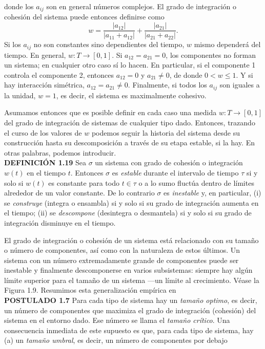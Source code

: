 {\fontsize{13}{15}\selectfont
donde los \( a_{ij} \) son en general números complejos. El grado de integración o cohesión del sistema puede entonces definirse como
\[w = \frac{|a_{12}|}{|a_{11} + a_{12}|} + \frac{|a_{21}|}{|a_{21} + a_{22}|}.\]
Si los \( a_{ij} \) no son constantes sino dependientes del tiempo, \( w \) mismo dependerá del tiempo. En general, \( w: T \rightarrow [0, 1] \).
Si \( a_{12} = a_{21} = 0 \), los componentes no forman un sistema; en cualquier otro caso sí lo hacen. En particular, si el componente 1 controla el componente 2, entonces \( a_{12} = 0 \) y \( a_{21} \neq 0 \), de donde \( 0 < w \leq 1 \). Y si hay interacción simétrica, \( a_{12} = a_{21} \neq 0 \). Finalmente, si todos los \( a_{ij} \) son iguales a la unidad, \( w = 1 \), es decir, el sistema es maximalmente cohesivo.

Asumamos entonces que es posible definir en cada caso una medida \( w: T \rightarrow [0, 1] \) del grado de integración de sistemas de cualquier tipo dado. Entonces, 
trazando el curso de los valores de \( w \) podemos seguir la historia del sistema desde su construcción hasta su descomposición a través de su etapa estable, si la hay. En otras palabras, podemos introducir. \\

\textbf{DEFINICIÓN 1.19} Sea \( \sigma \) un sistema con grado de cohesión o integración \( w(t) \) en el tiempo \( t \). Entonces \( \sigma \) es \textit{estable} durante el intervalo de tiempo \( \tau \) si y solo si \( w(t) \) es constante para todo \( t \in \tau \) o a lo sumo fluctúa dentro de límites alrededor de un valor constante. De lo contrario \( \sigma \) es \textit{inestable} y, en particular,
(i) se \textit{construye} (integra o ensambla) si y solo si su grado de integración aumenta en el tiempo;
(ii) se \textit{descompone} (desintegra o desmantela) si y solo si su grado de integración disminuye en el tiempo.

El grado de integración o cohesión de un sistema está relacionado con su tamaño o número de componentes, así como con la naturaleza de estos últimos. 
Un sistema con un número extremadamente grande de componentes puede ser inestable y finalmente descomponerse en varios subsistemas: siempre hay algún límite superior para el tamaño de un sistema —un límite al crecimiento. Véase la Figura 1.9. 
Resumimos esta generalización empírica en\\

\textbf{POSTULADO 1.7} Para cada tipo de sistema hay un \textit{tamaño optimo}, es decir, un número de componentes que maximiza el grado de integración (cohesión) del sistema en el entorno dado. Ese número se llama el \textit{tamaño crítico}.
Una consecuencia inmediata de este supuesto es que, para cada tipo de sistema, hay (a) un \textit{tamaño umbral}, es decir, un número de componentes por debajo
}

